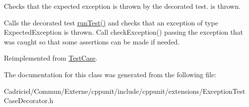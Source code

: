 Checks that the expected exception is thrown by the decorated test. is thrown. 

Calls the decorated test \hyperlink{class_exception_test_case_decorator_a3f78294d459a94f55413162d814f291d}{run\-Test()} and checks that an exception of type Expected\-Exception is thrown. Call check\-Exception() passing the exception that was caught so that some assertions can be made if needed. 

Reimplemented from \hyperlink{class_test_case_a6b55957ac1dfef01e5d9fa2475676f34}{Test\-Case}.



The documentation for this class was generated from the following file\-:\begin{DoxyCompactItemize}
\item 
Cadriciel/\-Commun/\-Externe/cppunit/include/cppunit/extensions/Exception\-Test\-Case\-Decorator.\-h\end{DoxyCompactItemize}
